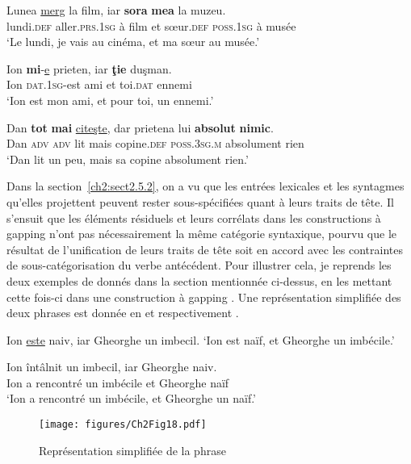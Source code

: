 \z


\ea \label{ch2:ex272}
\ea 
\gll Lunea  \uline{merg}  la  film,  iar  \textbf{sora} \textbf{mea}  la  muzeu. \label{ch2:ex272a}\\
lundi.\textsc{def} aller.\textsc{prs.1sg} à  film  et  sœur.\textsc{def} \textsc{poss.1sg}  à  musée\\ 
\glt ‘Le lundi, je vais au cinéma, et ma sœur au musée.’

\ex 
\gll Ion  \textbf{mi}{}-\uline{e} prieten,  iar  \textbf{ţie}  duşman. \label{ch2:ex272b}\\ 
Ion  \textsc{dat.1sg}-est  ami  et  toi.\textsc{dat} ennemi\\ 
\glt ‘Ion est mon ami, et pour toi, un ennemi.’

\ex 
\gll Dan  \textbf{tot}  \textbf{mai}  \uline{citeşte},  dar  prietena  lui  \textbf{absolut} \textbf{nimic}. \label{ch2:ex272c}\\
Dan \textsc{adv} \textsc{adv} lit  mais  copine.\textsc{def} \textsc{poss.3sg.m}  absolument  rien\\ 
\glt ‘Dan lit un peu, mais sa copine absolument rien.’
\z
\z

\newpage 
Dans la section~\ref{ch2:sect2.5.2}, on a vu que les entrées lexicales et les syntagmes qu’elles projettent peuvent rester sous-spécifiées quant à leurs traits de tête. Il s’ensuit que les éléments résiduels et leurs corrélats dans les constructions à gapping n’ont pas nécessairement la même catégorie syntaxique, pourvu que le résultat de l’unification de leurs traits de tête soit en accord avec les contraintes de sous-catégorisation du verbe antécédent. Pour illustrer cela, je reprends les deux exemples de  donnés dans la section mentionnée ci-dessus, en les mettant cette fois-ci dans une construction à gapping . Une représentation simplifiée des deux phrases est donnée en  et respectivement .  

\ea \label{ch2:ex273}
\ea Ion \uline{este} naiv, iar Gheorghe un imbecil. \label{ch2:ex273a}
\glt ‘Ion est naïf, et Gheorghe un imbécile.’   

\ex 
\gll *Ion    întâlnit  un  imbecil,  iar  Gheorghe  naiv. \label{ch2:ex273b}\\
Ion  a  rencontré  un  imbécile  et  Gheorghe  naïf\\ 
\glt ‘Ion a rencontré un imbécile, et Gheorghe un naïf.’ 
\z
\z


\begin{figure} 

\texttt{[image: figures/Ch2Fig18.pdf]}%

\caption{Représentation simplifiée de la phrase }
\label{ch2:fig18}
\end{figure}

